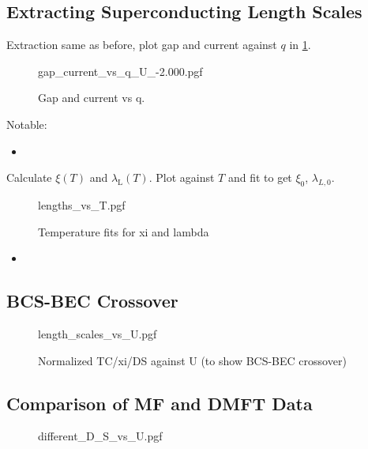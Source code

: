 \documentclass[../notes.tex]{subfiles}
\begin{document}
\subsection*{Extracting Superconducting Length Scales}

Extraction same as before, plot gap and current against \(q\) in \cref{fig:DMFT OBH gap and current vs q}.
\begin{figure}[H]
	\centering
	{gap_current_vs_q_U_-2.000.pgf}
	\label{fig:DMFT OBH gap and current vs q}
	\caption{Gap and current vs q.}
\end{figure}
Notable:
\begin{itemize}
	\item
\end{itemize}

Calculate \(\xi (T)\) and \(\lambda_{\mathrm{L}} (T)\).
Plot against \(T\) and fit to get \(\xi_0\), \(\lambda_{L,0}\).
\begin{figure}[H]
	\centering
	{lengths_vs_T.pgf}
	\caption{Temperature fits for xi and lambda}
	\label{fig:DMFT OBH temperature fits for xi and lambda}
\end{figure}
\begin{itemize}
	\item
\end{itemize}

\subsection*{BCS-BEC Crossover}

\begin{figure}[H]
	\centering
	{length_scales_vs_U.pgf}
	\caption{Normalized TC/xi/DS against U (to show BCS-BEC crossover)}
	\label{fig:DMFT OBH BCS to BEC crossover}
\end{figure}

\subsection*{Comparison of MF and DMFT Data}

\begin{figure}[H]
	\centering
	{different_D_S_vs_U.pgf}
	\caption{}
	\label{fig:DS comparison MF and DMFT}
\end{figure}

\end{document}
